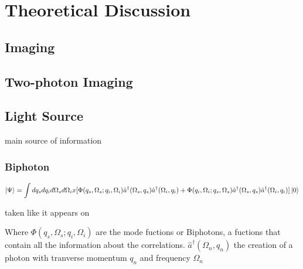 
\chapter{Theoretical Discussion} %

\label{Chapter2} %



 \section{Imaging}

\section{Two-photon Imaging}



\section{Light Source}

main source of information \cite{physicsGhost}
\subsection{Biphoton}

\begin{equation}
\ket{\Psi}=\int dq_s dq_i d\Omega_s d\Omega_i 
x [\Phi(q_s,\Omega_s;q_i,\Omega_i) \hat{a}^{\dagger} (\Omega_s,q_s) \hat{a}^{\dagger}(\Omega_i,q_i) \\
+ \Phi(q_i,\Omega_i;q_s,\Omega_s) \hat{a}^{\dagger}(\Omega_s,q_s) \hat{a}^{\dagger}(\Omega_i,q_i)]   \ket{0}  
\end{equation}

taken like it appears on \cite{spatiocorrelations}

 Where $\Phi(q_s,\Omega_s;q_i,\Omega_i)$ are the mode fuctions or Biphotons, a fuctions that contain all the information about the correlations. $ \hat{a}^{\dagger}(\Omega_n,q_n)$ the creation of a photon with tranverse momentum $q_n$ and frequency $\Omega_n$


